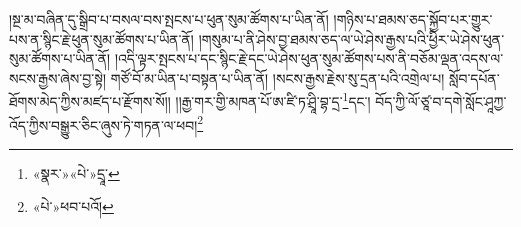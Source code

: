 །སྔ་མ་བཞིན་དུ་སྒྲིབ་པ་བསལ་བས་སྤངས་པ་ཕུན་སུམ་ཚོགས་པ་ཡིན་ནོ། །གཉིས་པ་ཐམས་ཅད་སྐྱོབ་པར་གྱུར་པས་ན་སྙིང་རྗེ་ཕུན་སུམ་ཚོགས་པ་ཡིན་ནོ། །གསུམ་པ་ནི་ཤེས་བྱ་ཐམས་ཅད་ལ་ཡེ་ཤེས་རྒྱས་པའི་ཕྱིར་ཡེ་ཤེས་ཕུན་སུམ་ཚོགས་པ་ཡིན་ནོ། །འདི་ལྟར་སྤངས་པ་དང་སྙིང་རྗེ་དང་ཡེ་ཤེས་ཕུན་སུམ་ཚོགས་པས་ནི་བཅོམ་ལྡན་འདས་ལ་སངས་རྒྱས་ཞེས་བྱ་སྟེ། གཙོ་བོ་མ་ཡིན་པ་བསྟན་པ་ཡིན་ནོ། །སངས་རྒྱས་རྗེས་སུ་དྲན་པའི་འགྲེལ་པ། སློབ་དཔོན་ཐོགས་མེད་ཀྱིས་མཛད་པ་རྫོགས་སོ།། །།རྒྱ་གར་གྱི་མཁན་པོ་ཨ་ཛི་ཏ་ཤྲཱི་བྷ་དྲ་\footnote{«སྣར་»«པེ་»དྲཱ་}དང་། བོད་ཀྱི་ལོ་ཙཱ་བ་དགེ་སློང་ཤཱཀྱ་འོད་ཀྱིས་བསྒྱུར་ཅིང་ཞུས་ཏེ་གཏན་ལ་ཕབ།\footnote{«པེ་»ཕབ་པའོ།} 